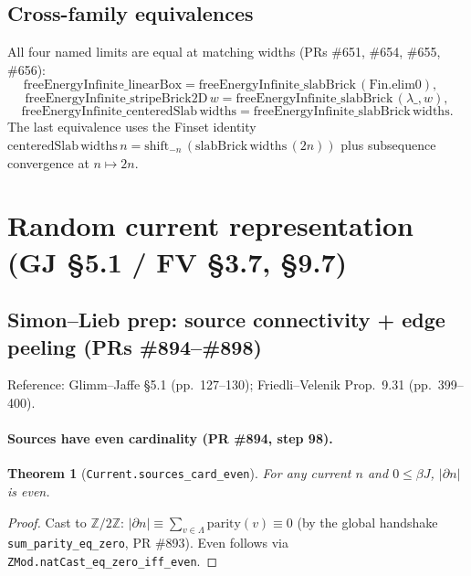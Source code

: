 \documentclass[a4paper,11pt]{article}
\newtheorem{theorem}{Theorem}
\begin{document}
\subsection{Cross-family equivalences}

All four named limits are equal at matching widths (PRs \#651,
\#654, \#655, \#656):
\[
  \mathrm{freeEnergyInfinite\_linearBox} =
  \mathrm{freeEnergyInfinite\_slabBrick}\,(\mathrm{Fin.elim0}), \quad
\]
\[
  \mathrm{freeEnergyInfinite\_stripeBrick2D}\,w =
  \mathrm{freeEnergyInfinite\_slabBrick}\,(\lambda\_,w),
\]
\[
  \mathrm{freeEnergyInfinite\_centeredSlab}\,\mathrm{widths} =
  \mathrm{freeEnergyInfinite\_slabBrick}\,\mathrm{widths}.
\]
The last equivalence uses the Finset identity
$\mathrm{centeredSlab}\,\mathrm{widths}\,n =
\mathrm{shift}_{-n}\,(\mathrm{slabBrick}\,\mathrm{widths}\,(2n))$
plus subsequence convergence at $n \mapsto 2n$.

\section{Random current representation (GJ §5.1 / FV §3.7, §9.7)}

\subsection{Simon--Lieb prep: source connectivity + edge peeling (PRs \#894--\#898)}

Reference: Glimm--Jaffe \cite{glimm-jaffe} \S5.1 (pp.~127--130);
Friedli--Velenik \cite{friedli-velenik} Prop.~9.31 (pp.~399--400).

\paragraph{Sources have even cardinality (PR \#894, step 98).}

\begin{theorem}[\texttt{Current.sources\_card\_even}]
  For any current $n$ and $0 \le \beta J$, $|\partial n|$ is even.
\end{theorem}
\begin{proof}
  Cast to $\mathbb{Z}/2\mathbb{Z}$: $|\partial n| \equiv \sum_{v \in \Lambda} \mathrm{parity}(v) \equiv 0$
  (by the global handshake \texttt{sum\_parity\_eq\_zero}, PR \#893).
  Even follows via \texttt{ZMod.natCast\_eq\_zero\_iff\_even}.
\end{proof}
\end{document}
